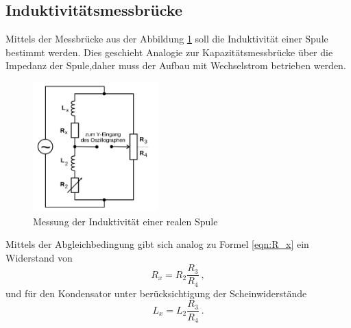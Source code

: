 \subsection{Induktivitätsmessbrücke}
Mittels der Messbrücke aus der Abbildung \ref{fig:L} soll die Induktivität einer Spule bestimmt werden. Dies geschieht Analogie zur Kapazitätsmessbrücke über die Impedanz der Spule,daher muss der Aufbau mit Wechselstrom betrieben werden.

\begin{figure}
  \centering
  \includegraphics[height=5cm]{picture/4.png}
  \caption{Messung der Induktivität einer realen Spule}
  \label{fig:L}
\end{figure}
Mittels der Abgleichbedingung gibt sich analog zu Formel \ref{eqn:R_x} ein Widerstand von
\begin{equation*}
     R_x = R_2 \frac{R_3}{R_4} \ ,
\end{equation*}
und für den Kondensator unter berücksichtigung der Scheinwiderstände
\begin{equation}
   L_x = L_2 \frac{R_3}{R_4} \ .
   \label{eqn:L_x}
\end{equation}
